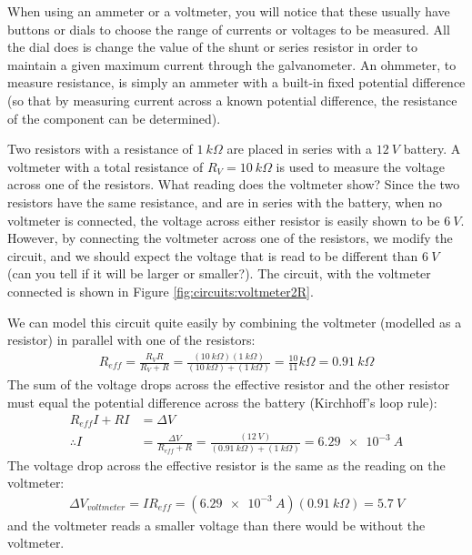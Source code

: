 When using an ammeter or a voltmeter, you will notice that these usually have buttons or dials to choose the range of currents or voltages to be measured. All the dial does is change the value of the shunt or series resistor in order to maintain a given maximum current through the galvanometer. An ohmmeter, to measure resistance, is simply an ammeter with a built-in fixed potential difference (so that by measuring current across a known potential difference, the resistance of the component can be determined). 
\vspace{-0.25cm}
\begin{example}{Two resistors with a resistance of $\SI{1}{k\Omega}$ are placed in series with a $\SI{12}{V}$ battery. A voltmeter with a total resistance of $R_V=\SI{10}{k\Omega}$ is used to measure the voltage across one of the resistors. What reading does the voltmeter show?}
Since the two resistors have the same resistance, and are in series with the battery, when no voltmeter is connected, the voltage across either resistor is easily shown to be $\SI{6}{V}$. However, by connecting the voltmeter across one of the resistors, we modify the circuit, and we should expect the voltage that is read to be different than $\SI{6}{V}$ (can you tell if it will be larger or smaller?). The circuit, with the voltmeter connected is shown in Figure \ref{fig:circuits:voltmeter2R}.


We can model this circuit quite easily by combining the voltmeter (modelled as a resistor) in parallel with one of the resistors:
\begin{align*}
R_{eff}=\frac{R_VR}{R_V+R}=\frac{(\SI{10}{k\Omega})(\SI{1}{k\Omega})}{(\SI{10}{k\Omega})+(\SI{1}{k\Omega})}=\frac{10}{11}\si{k\Omega}=\SI{0.91}{k\Omega}
\end{align*}
The sum of the voltage drops across the effective resistor and the other resistor must equal the potential difference across the battery (Kirchhoff's loop rule):
\begin{align*}
R_{eff}I+RI&=\Delta V\\
\therefore I &= \frac{\Delta V}{R_{eff}+R}=\frac{(\SI{12}{V})}{(\SI{0.91}{k\Omega})+(\SI{1}{k\Omega})}=\SI{6.29e-3}{A}
\end{align*}
The voltage drop across the effective resistor is the same as the reading on the voltmeter:
\begin{align*}
\Delta V_{voltmeter}=IR_{eff}=(\SI{6.29e-3}{A})(\SI{0.91}{k\Omega})=\SI{5.7}{V}
\end{align*}
and the voltmeter reads a smaller voltage than there would be without the voltmeter.


\end{example}

